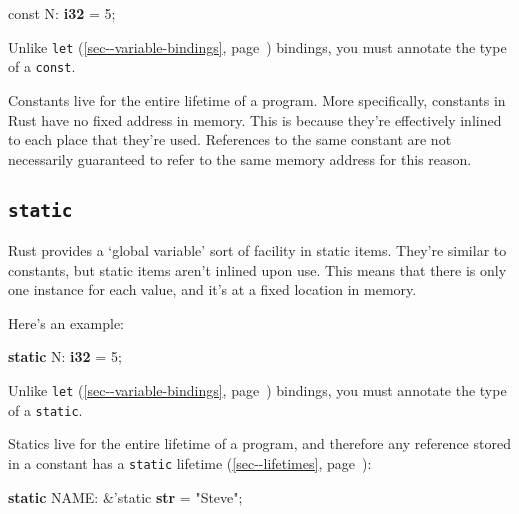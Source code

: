 \documentclass[a4paper,]{book}
\renewcommand*{\hyperref}[2][\ar]{%
  \def\ar{#2}%
  #2 (\autoref{#1}, page~\pageref{#1})}
\newenvironment{Shaded}{\begin{snugshade}}{\end{snugshade}}
\newcommand{\KeywordTok}[1]{\textcolor[rgb]{0.13,0.29,0.53}{\textbf{{#1}}}}
\newcommand{\DecValTok}[1]{\textcolor[rgb]{0.00,0.00,0.81}{{#1}}}
\newcommand{\StringTok}[1]{\textcolor[rgb]{0.31,0.60,0.02}{{#1}}}
\newcommand{\OtherTok}[1]{\textcolor[rgb]{0.56,0.35,0.01}{{#1}}}
\newcommand{\NormalTok}[1]{{#1}}
\begin{document}
\begin{Shaded}
\begin{Highlighting}[]
\NormalTok{const N: }\KeywordTok{i32} \NormalTok{= }\DecValTok{5}\NormalTok{;}
\end{Highlighting}
\end{Shaded}

Unlike \hyperref[sec--variable-bindings]{\texttt{let}} bindings, you
must annotate the type of a \texttt{const}.

Constants live for the entire lifetime of a program. More specifically,
constants in Rust have no fixed address in memory. This is because
they're effectively inlined to each place that they're used. References
to the same constant are not necessarily guaranteed to refer to the same
memory address for this reason.

\subsection{\texorpdfstring{\texttt{static}}{static}}\label{static-1}

Rust provides a `global variable' sort of facility in static items.
They're similar to constants, but static items aren't inlined upon use.
This means that there is only one instance for each value, and it's at a
fixed location in memory.

Here's an example:

\begin{Shaded}
\begin{Highlighting}[]
\KeywordTok{static} \NormalTok{N: }\KeywordTok{i32} \NormalTok{= }\DecValTok{5}\NormalTok{;}
\end{Highlighting}
\end{Shaded}

Unlike \hyperref[sec--variable-bindings]{\texttt{let}} bindings, you
must annotate the type of a \texttt{static}.

Statics live for the entire lifetime of a program, and therefore any
reference stored in a constant has a
\hyperref[sec--lifetimes]{\texttt{\textquotesingle{}static} lifetime}:

\begin{Shaded}
\begin{Highlighting}[]
\KeywordTok{static} \NormalTok{NAME: &}\OtherTok{'static} \KeywordTok{str} \NormalTok{= }\StringTok{"Steve"}\NormalTok{;}
\end{Highlighting}
\end{Shaded}
\end{document}
